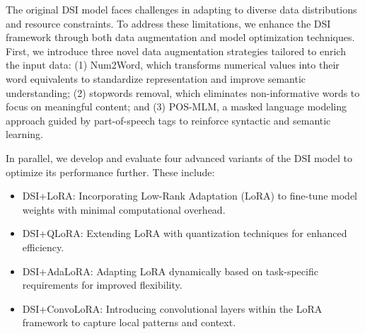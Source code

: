 The original DSI model faces challenges in adapting to diverse data distributions and resource constraints. To address these limitations, we enhance the DSI framework through both data augmentation and model optimization techniques. First, we introduce three novel data augmentation strategies tailored to enrich the input data: (1) Num2Word, which transforms numerical values into their word equivalents to standardize representation and improve semantic understanding; (2) stopwords removal, which eliminates non-informative words to focus on meaningful content; and (3) POS-MLM, a masked language modeling approach guided by part-of-speech tags to reinforce syntactic and semantic learning.

In parallel, we develop and evaluate four advanced variants of the DSI model to optimize its performance further. These include:
\begin{itemize}
    \item DSI+LoRA: Incorporating Low-Rank Adaptation (LoRA) to fine-tune model weights with minimal computational overhead.
    \item DSI+QLoRA: Extending LoRA with quantization techniques for enhanced efficiency.
    \item DSI+AdaLoRA: Adapting LoRA dynamically based on task-specific requirements for improved flexibility.
    \item DSI+ConvoLoRA: Introducing convolutional layers within the LoRA framework to capture local patterns and context.
\end{itemize}

